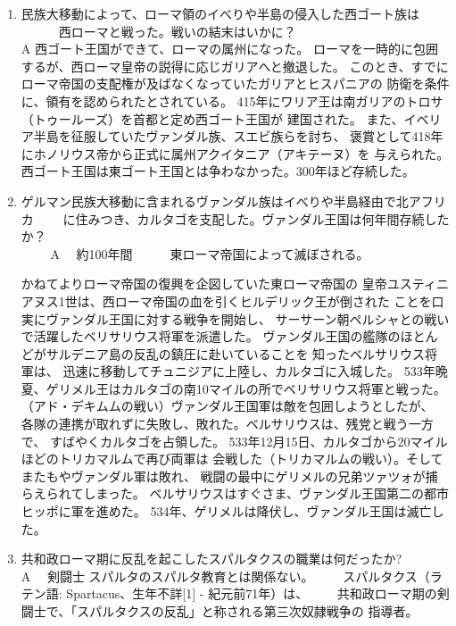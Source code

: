 \documentclass[fleqn]{article}
\begin{document}
\begin{enumerate}
\item{
民族大移動によって、ローマ領のイべりや半島の侵入した西ゴート族は
　　　西ローマと戦った。戦いの結末はいかに？\\
\vspace{1zw}A 
  西ゴート王国ができて、ローマの属州になった。
	ローマを一時的に包囲するが、西ローマ皇帝の説得に応じガリアへと撤退した。
	このとき、すでにローマ帝国の支配権が及ばなくなっていたガリアとヒスパニアの
	防衛を条件に、領有を認められたとされている。
	415年にワリア王は南ガリアのトロサ（トゥールーズ）を首都と定め西ゴート王国が
	建国された。
	また、イベリア半島を征服していたヴァンダル族、スエビ族らを討ち、
	褒賞として418年にホノリウス帝から正式に属州アクイタニア（アキテーヌ）を
	与えられた。
	西ゴート王国は東ゴート王国とは争わなかった。300年ほど存続した。
}
\item{
ゲルマン民族大移動に含まれるヴァンダル族はイべりや半島経由で北アフリカ
　　に住みつき、カルタゴを支配した。ヴァンダル王国は何年間存続したか？\\
　　
\vspace{1zw}A 　約100年間　　　東ローマ帝国によって滅ぼされる。

	かねてよりローマ帝国の復興を企図していた東ローマ帝国の
	皇帝ユスティニアヌス1世は、西ローマ帝国の血を引くヒルデリック王が倒された
	ことを口実にヴァンダル王国に対する戦争を開始し、
	サーサーン朝ペルシャとの戦いで活躍したベリサリウス将軍を派遣した。
	ヴァンダル王国の艦隊のほとんどがサルデニア島の反乱の鎮圧に赴いていることを
	知ったベルサリウス将軍は、 
	迅速に移動してチュニジアに上陸し、カルタゴに入城した。
	533年晩夏、ゲリメル王はカルタゴの南10マイルの所でベリサリウス将軍と戦った。
	（アド・デキムムの戦い）ヴァンダル王国軍は敵を包囲しようとしたが、
	各隊の連携が取れずに失敗し、敗れた。ベルサリウスは、残党と戦う一方で、
	すばやくカルタゴを占領した。
	533年12月15日、カルタゴから20マイルほどのトリカマルムで再び両軍は
	会戦した（トリカマルムの戦い）。そしてまたもやヴァンダル軍は敗れ、
	戦闘の最中にゲリメルの兄弟ツァツォが捕らえられてしまった。
	 ベルサリウスはすぐさま、ヴァンダル王国第二の都市ヒッポに軍を進めた。
	534年、ゲリメルは降伏し、ヴァンダル王国は滅亡した。

}
\item{
共和政ローマ期に反乱を起こしたスパルタクスの職業は何だったか?\\
\vspace{1zw}A 　剣闘士
	スパルタのスパルタ教育とは関係ない。
　　スパルタクス（ラテン語: Spartacus、生年不詳[1] - 紀元前71年）は、
　　共和政ローマ期の剣闘士で、「スパルタクスの反乱」と称される第三次奴隷戦争の
	指導者。

}
\end{enumerate}
\end{document}
